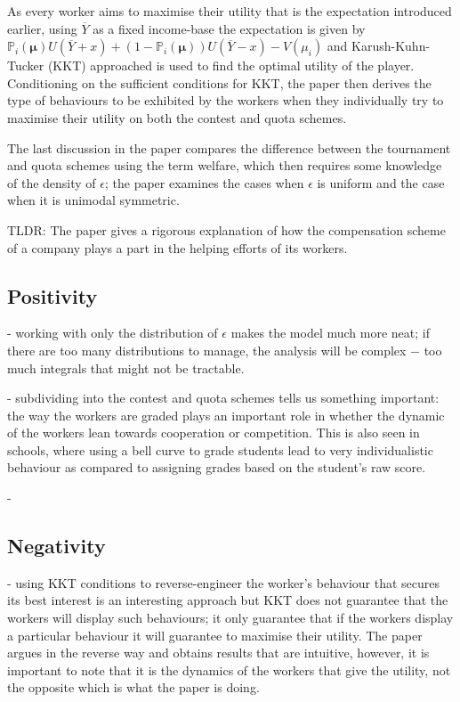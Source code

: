 \documentclass[a4paper,10pt,leqno]{article}
\theoremstyle{definition}
\begin{document}
As every worker aims to maximise their utility that is the expectation introduced earlier, using $\overline{Y}$ as a fixed income-base the expectation is given by $\mathbb{P}_i(\mathbf{\mu})U(\overline{Y}+x)+(1-\mathbb{P}_i(\mathbf{\mu}))U(\overline{Y}-x)-V(\mu_i)$
and Karush-Kuhn-Tucker (KKT) approached is used to find the optimal utility of the player. Conditioning on the sufficient conditions for KKT, the paper then derives the type of behaviours to be exhibited by the workers when they individually try to maximise their utility on both the contest and quota schemes.

The last discussion in the paper compares the difference between the tournament and quota schemes using the term welfare, which then requires some knowledge of the density of $\epsilon$; the paper examines the cases when $\epsilon$ is uniform and the case when it is unimodal symmetric.

TLDR: The paper gives a rigorous explanation of how the compensation scheme of a company plays a part in the helping efforts of its workers. 
 


\subsection*{Positivity}
- working with only the distribution of $\epsilon$ makes the model much more neat; if there are too many distributions to manage, the analysis will be complex $-$ too much integrals that might not be tractable.


- subdividing into the contest and quota schemes tells us something important: the way the workers are graded plays an important role in whether the dynamic of the workers lean towards cooperation or competition. This is also seen in schools, where using a bell curve to grade students lead to very individualistic behaviour as compared to assigning grades based on the student's raw score.

-  



\subsection*{Negativity}

-  using KKT conditions to reverse-engineer the worker's behaviour that secures its best interest is an interesting approach but KKT does not guarantee that the workers will display such behaviours; it only guarantee that if the workers display a particular behaviour it will guarantee to maximise their utility. The paper argues in the reverse way and obtains results that are intuitive, however, it is important to note that it is the dynamics of the workers that give the utility, not the opposite which is what the paper is doing.
\end{document}
